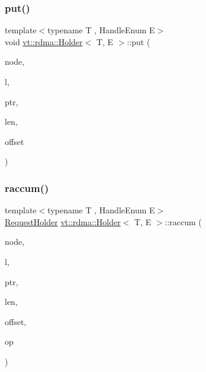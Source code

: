 \subsubsection{\texorpdfstring{put()}{put()}}
{\footnotesize\ttfamily template$<$typename T , Handle\+Enum E$>$ \\
void \hyperlink{structvt_1_1rdma_1_1_holder}{vt\+::rdma\+::\+Holder}$<$ T, E $>$\+::put (\begin{DoxyParamCaption}\item[{\hyperlink{namespacevt_a866da9d0efc19c0a1ce79e9e492f47e2}{vt\+::\+Node\+Type}}]{node,  }\item[{\hyperlink{namespacevt_1_1rdma_ac5c20b41a653e520b6305d4d454ecb70}{Lock}}]{l,  }\item[{T $\ast$}]{ptr,  }\item[{std\+::size\+\_\+t}]{len,  }\item[{int}]{offset }\end{DoxyParamCaption})}

\mbox{\label{structvt_1_1rdma_1_1_holder_a1d1abbaaad0d2490b01b10493fe78e36}} 
\subsubsection{\texorpdfstring{raccum()}{raccum()}}
{\footnotesize\ttfamily template$<$typename T , Handle\+Enum E$>$ \\
\hyperlink{structvt_1_1rdma_1_1_request_holder}{Request\+Holder} \hyperlink{structvt_1_1rdma_1_1_holder}{vt\+::rdma\+::\+Holder}$<$ T, E $>$\+::raccum (\begin{DoxyParamCaption}\item[{\hyperlink{namespacevt_a866da9d0efc19c0a1ce79e9e492f47e2}{vt\+::\+Node\+Type}}]{node,  }\item[{\hyperlink{namespacevt_1_1rdma_ac5c20b41a653e520b6305d4d454ecb70}{Lock}}]{l,  }\item[{T $\ast$}]{ptr,  }\item[{std\+::size\+\_\+t}]{len,  }\item[{int}]{offset,  }\item[{M\+P\+I\+\_\+\+Op}]{op }\end{DoxyParamCaption})}

\mbox{\label{structvt_1_1rdma_1_1_holder_a61b649c8c420b9f2f6310d752bdef79c}} 
